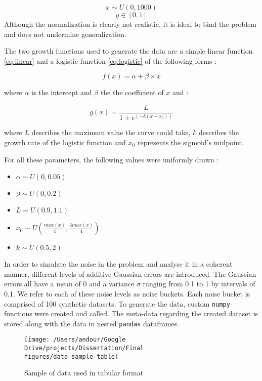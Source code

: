 \documentclass[12pt,]{article}
\providecommand{\tightlist}{%
  \setlength{\itemsep}{0pt}\setlength{\parskip}{0pt}}
\begin{document}
\[x \sim U(0, 1000)\]
\[y \in[0, 1]\]
Although the normalization is clearly not realistic, it is ideal to bind the problem and does not undermine generalization.

The two growth functions used to generate the data are a simple linear function \eqref{eq:linear} and a logistic function \eqref{eq:logistic} of the following forms :

\begin{equation}
f(x) = \alpha + \beta \times x \label{eq:linear}
\end{equation}

where \(\alpha\) is the intercept and \(\beta\) the the coefficient of \(x\) and :

\begin{equation}
g(x) = \frac {L} {1 +  e^ {(-k(x - x_0))}} \label{eq:logistic}
\end{equation}

where \(L\) describes the maximum value the curve could take, \(k\) describes the growth rate of the logistic function and \(x_0\) represents the sigmoid's midpoint.

For all these parameters, the following values were uniformly drawn :

\begin{itemize}
\tightlist
\item
  \(\alpha \sim U(0, 0.05)\)
\item
  \(\beta \sim U(0,0.2)\)
\item
  \(L \sim U(0.9, 1.1)\)
\item
  \(x_0 \sim U(\frac{max(x)}{4} , \frac {3max(x)}{4})\)
\item
  \(k \sim U(0.5, 2)\)
\end{itemize}

In order to simulate the noise in the problem and analyse it in a coherent manner, different levels of additive Gaussian errors are introduced. The Gaussian errors all have a mean of 0 and a variance \(\sigma\) ranging from 0.1 to 1 by intervals of 0.1. We refer to each of these noise levels as noise buckets. Each noise bucket is comprised of 100 synthetic datasets. To generate the data, custom \texttt{numpy} functions were created and called. The meta-data regarding the created dataset is stored along with the data in nested \texttt{pandas} dataframes.

\begin{figure}

{\centering \texttt{[image: /Users/andour/Google Drive/projects/Dissertation/Final figures/data\_sample\_table]} 

}

\caption{Sample of data used in tabular format}\label{fig:tabdata}
\end{figure}
\end{document}

